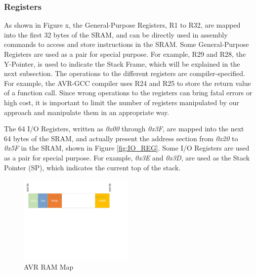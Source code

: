 \subsubsection{Registers}

As shown in Figure x, the General-Purpose Registers, R1 to R32, are mapped into the first 32 bytes of the SRAM, and can be directly used in assembly commands to access and store instructions in the SRAM. Some General-Purpose Registers are used as a pair for special purpose. For example, R29 and R28, the Y-Pointer, is used to indicate the Stack Frame, which will be explained in the next subsection. The operations to the different registers are compiler-specified. For example, the AVR-GCC compiler uses R24 and R25 to store the return value of a function call. Since wrong operations to the registers can bring fatal errors or high cost, it is important to limit the number of registers manipulated by our approach and manipulate them in an appropriate way.

The 64 I/O Registers, written as \textit{0x00} through \textit{0x3F}, are mapped into the next 64 bytes of the SRAM, and actually present the address section from \textit{0x20} to \textit{0x5F} in the SRAM,  shown in Figure \ref{fig:IO_REG}. Some I/O Registers are used as a pair for special purpose. For example, \textit{0x3E} and \textit{0x3D}, are used as the Stack Pointer (SP), which indicates the current top of the stack.


\begin{figure}
\centering
\includegraphics[width=0.5\textwidth]{figures/Memory_model.pdf}
\caption{AVR RAM Map}
\label{fig:ram_map}
\end{figure}





